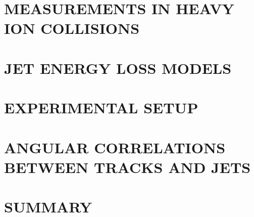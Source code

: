 \documentclass[fullpage, hidelinks]{uiucthesis2009}
\begin{document}
\chapter{MEASUREMENTS IN HEAVY ION COLLISIONS}
\label{sec:jetMeasurements}

\clearpage

\chapter{JET ENERGY LOSS MODELS}
\label{sec:jetModels}

\clearpage

\chapter{EXPERIMENTAL SETUP}
\label{sec:setup}

\clearpage

\chapter{ANGULAR CORRELATIONS BETWEEN TRACKS AND JETS}
\label{sec:mainanalysis}

\clearpage

\chapter{SUMMARY}
\label{sec:summary}

\clearpage


\printbibliography[heading=bibintoc,title={REFERENCES}]
\end{document}
